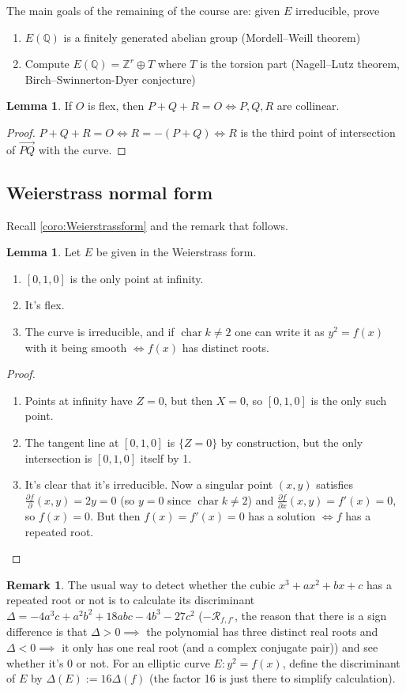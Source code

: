 \documentclass{article}
\newcommand{\Z}{\mathbb{Z}}
\newcommand{\Q}{\mathbb{Q}}
\newcommand{\Char}{\operatorname{char}}
\theoremstyle{definition}
\newtheorem{lemma}[defn]{Lemma}
\newtheorem*{remark}{Remark}
\begin{document}
The main goals of the remaining of the course are: given $E$ irreducible, prove
\begin{enumerate}
\item $E(\Q)$ is a finitely generated abelian group (Mordell--Weill theorem)
\item Compute $E(\Q)=\Z^r\oplus T$ where $T$ is the torsion part (Nagell--Lutz theorem, Birch--Swinnerton-Dyer conjecture)
\end{enumerate}

\begin{lemma}
\label{lemma:condPQRcol}
If $O$ is flex, then $P+Q+R=O\iff P,Q,R$ are collinear.
\end{lemma}
\begin{proof}
$P+Q+R=O\iff R=-(P+Q)\iff R$ is the third point of intersection of $\overrightarrow{PQ}$ with the curve.
\end{proof}

\subsection{Weierstrass normal form}
Recall \ref{coro:Weierstrassform} and the remark that follows.
\begin{lemma}
\label{lemma:weierstrass}
Let $E$ be given in the Weierstrass form.
\begin{enumerate}
\item $[0,1,0]$ is the only point at infinity.
\item It's flex.
\item The curve is irreducible, and if $\Char k\neq 2$ one can write it as $y^2=f(x)$ with it being smooth $\iff f(x)$ has distinct roots.
\end{enumerate}
\end{lemma}
\begin{proof}
\begin{enumerate}
\item Points at infinity have $Z=0$, but then $X=0$, so $[0,1,0]$ is the only such point.
\item The tangent line at $[0,1,0]$ is $\{Z=0\}$ by construction, but the only intersection is $[0,1,0]$ itself by 1.
\item It's clear that it's irreducible. Now a singular point $(x,y)$ satisfies $\frac{\partial f}{\partial}(x,y)=2y=0$ (so $y=0$ since $\Char k\neq 2$) and $\frac{\partial f}{\partial x}(x,y)=f'(x)=0$, so $f(x)=0$. But then $f(x)=f'(x)=0$ has a solution $\iff f$ has a repeated root.
\end{enumerate}
\end{proof}
\begin{remark}
The usual way to detect whether the cubic $x^3+ax^2+bx+c$ has a repeated root or not is to calculate its discriminant $\Delta=-4a^3c+a^2b^2+18abc-4b^3-27c^2$ ($-\mathcal R_{f,f'}$, the reason that there is a sign difference is that $\Delta>0\implies$ the polynomial has three distinct real roots and $\Delta<0\implies$ it only has one real root (and a complex conjugate pair)) and see whether it's 0 or not. For an elliptic curve $E:y^2=f(x)$, define the discriminant of $E$ by $\Delta(E):=16\Delta(f)$ (the factor 16 is just there to simplify calculation).
\end{remark}
\end{document}

